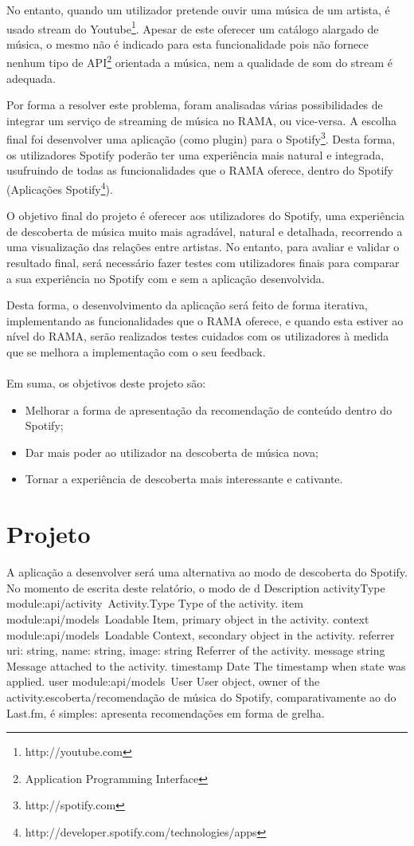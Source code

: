 No entanto, quando um utilizador pretende ouvir uma música de um artista, é usado stream do Youtube\footnote{http://youtube.com}. 
Apesar de este oferecer um catálogo alargado de música, o mesmo não é indicado para esta funcionalidade pois não fornece nenhum tipo de API\footnote{Application Programming Interface} orientada a música, nem a qualidade de som do stream é adequada.

Por forma a resolver este problema, foram analisadas várias possibilidades de integrar um serviço de streaming de música no RAMA, ou vice-versa.
A escolha final foi desenvolver uma aplicação (como plugin) para o Spotify\footnote{http://spotify.com}.
Desta forma, os utilizadores Spotify poderão ter uma experiência mais natural e integrada, usufruindo de todas as funcionalidades que o RAMA oferece, dentro do Spotify (Aplicações Spotify\footnote{http://developer.spotify.com/technologies/apps}).
 

O objetivo final do projeto é oferecer aos utilizadores do Spotify, uma experiência de descoberta de música muito mais agradável, natural e detalhada, recorrendo a uma visualização das relações entre artistas.
No entanto, para avaliar e validar o resultado final, será necessário fazer testes com utilizadores finais para comparar a sua experiência no Spotify com e sem a aplicação desenvolvida.

Desta forma, o desenvolvimento da aplicação será feito de forma iterativa, implementando as funcionalidades que o RAMA oferece, e quando esta estiver ao nível do RAMA, serão realizados testes cuidados com os utilizadores à medida que se melhora a implementação com o seu feedback.
 \\
 \\
Em suma, os objetivos deste projeto são:

\begin{itemize}
  \item Melhorar a forma de apresentação da recomendação de conteúdo dentro do Spotify;
  \item Dar mais poder ao utilizador na descoberta de música nova;
  \item Tornar a experiência de descoberta mais interessante e cativante.
\end{itemize}

\section{Projeto} \label{sec:proj}

A aplicação a desenvolver será uma alternativa ao modo de descoberta do Spotify.
No momento de escrita deste relatório, o modo de d  Description
activityType  module:api/activity~Activity.Type Type of the activity.
item  module:api/models~Loadable  Item, primary object in the activity.
context module:api/models~Loadable  Context, secondary object in the activity.
referrer   {uri: string, name: string, image: string} Referrer of the activity.
message  string Message attached to the activity.
timestamp  Date The timestamp when state was applied.
user  module:api/models~User  User object, owner of the activity.escoberta/recomendação de música do Spotify, comparativamente ao do Last.fm, é simples: apresenta recomendações em forma de grelha.

